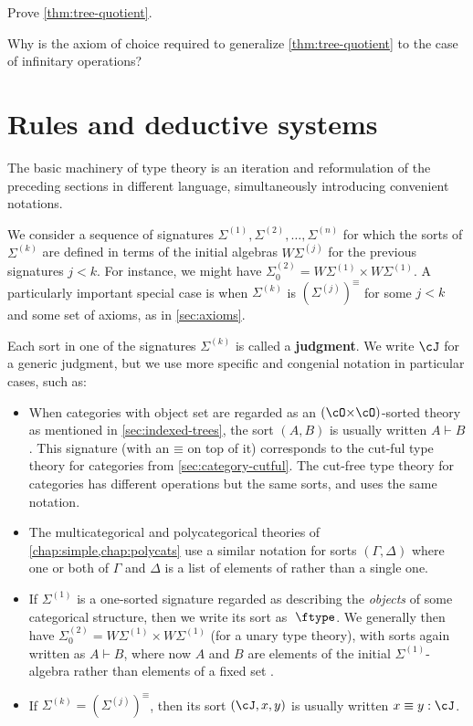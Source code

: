 \documentclass{book}
\def\sig{\Sigma}
\def\equivsym{\mathord{\equiv}}
\let\types\vdash
\def\type{\;\ftype}
\begin{document}
\begin{ex}\label{ex:tree-quotient}
  Prove \cref{thm:tree-quotient}.
\end{ex}

\begin{ex}
  Why is the axiom of choice required to generalize \cref{thm:tree-quotient} to the case of infinitary operations?
\end{ex}


\section{Rules and deductive systems}
\label{sec:rules}

The basic machinery of type theory is an iteration and reformulation of the preceding sections in different language, simultaneously introducing convenient notations.

We consider a sequence of signatures $\sig^{(1)},\sig^{(2)},\dots,\sig^{(n)}$ for which the sorts of $\sig^{(k)}$ are defined in terms of the initial algebras $W\sig^{(j)}$ for the previous signatures $j<k$.
For instance, we might have $\sig^{(2)}_0 = W\sig^{(1)} \times W\sig^{(1)}$.
A particularly important special case is when $\sig^{(k)}$ is $(\sig^{(j)})^{\equivsym}$ for some $j<k$ and some set of axioms, as in \cref{sec:axioms}.

Each sort in one of the signatures $\sig^{(k)}$ is called a \textbf{judgment}.
We write $\cJ$ for a generic judgment, but we use more specific and congenial notation in particular cases, such as:
\begin{itemize}
\item When categories with object set \cO are regarded as an $(\cO\times\cO)$-sorted theory as mentioned in \cref{sec:indexed-trees}, the sort $(A,B)$ is usually written $A\types B$.
  This signature (with an $\equivsym$ on top of it) corresponds to the cut-ful type theory for categories from \cref{sec:category-cutful}.
  The cut-free type theory for categories has different operations but the same sorts, and uses the same notation.
\item The multicategorical and polycategorical theories of \cref{chap:simple,chap:polycats} use a similar notation for sorts $(\Gamma,\Delta)$ where one or both of $\Gamma$ and $\Delta$ is a list of elements of \cO rather than a single one.
\item If $\sig^{(1)}$ is a one-sorted signature regarded as describing the \emph{objects} of some categorical structure, then we write its sort as $\type$.
  We generally then have $\sig^{(2)}_0 = W\sig^{(1)} \times W\sig^{(1)}$ (for a unary type theory), with sorts again written as $A\types B$, where now $A$ and $B$ are elements of the initial $\sig^{(1)}$-algebra rather than elements of a fixed set \cO.
\item If $\sig^{(k)}=(\sig^{(j)})^{\equivsym}$, then its sort $(\cJ,x,y)$ is usually written $x\equiv y : \cJ$.
\end{itemize}
\end{document}
